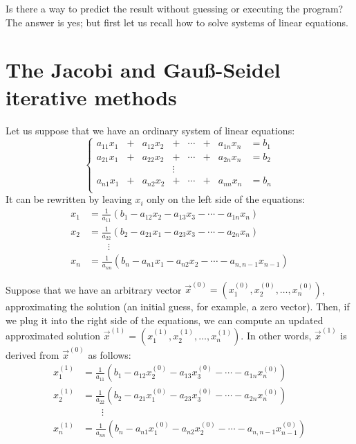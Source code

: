 \documentclass[notitlepage,oneside]{book}
\begin{document}
Is there a way to predict the result without guessing or executing the program? The answer is yes; but first let us recall how to solve systems of linear equations.

\section{The Jacobi and Gauß-Seidel iterative methods}
\label{sec:gauss-seidel}
Let us suppose that we have an ordinary system of linear equations:
$$
\left\{
\begin{array}{cccccccc}
a_{11}x_1 & + &  a_{12}x_2  &+      & \cdots & + & a_{1n}x_n &= b_1\\
a_{21}x_1 & + &  a_{22}x_2  &+      & \cdots & + & a_{2n}x_n &= b_2\\
          &   &             &\vdots &        &   &           &     \\
a_{n1}x_1 & + &  a_{n2}x_2  &+      & \cdots & + & a_{nn}x_n &= b_n\\
\end{array}
\right.
$$
It can be rewritten by leaving  $x_i$ only on the left side of the equations:
\begin{align*}
x_1 &= \frac{1}{a_{11}}(b_1 - a_{12}x_2 - a_{13}x_3 - \cdots - a_{1n}x_n)\\
x_2 &= \frac{1}{a_{22}}(b_2 - a_{21}x_1 - a_{23}x_3 - \cdots - a_{2n}x_n)\\
    & \qquad \vdots \\
x_n &= \frac{1}{a_{nn}}(b_n - a_{n1}x_1 - a_{n2}x_2 - \cdots - a_{n,n-1}x_{n-1})
\end{align*}

Suppose that we have an arbitrary vector $\vec{x}^{(0)}=\left(x_1^{(0)}, x_2^{(0)}, \dots, x_n^{(0)}\right)$, approximating the solution (an initial guess, for example, a zero vector).
Then, if we plug it into the right side of the equations, we can compute an updated approximated solution $\vec{x}^{(1)}=\left(x_1^{(1)}, x_2^{(1)}, \dots, x_n^{(1)}\right)$.
In other words, $\vec{x}^{(1)}$ is derived from $\vec{x}^{(0)}$ as follows:
\begin{align*}
x_1^{(1)} &= \frac{1}{a_{11}}(b_1 - a_{12}x_2^{(0)} - a_{13}x_3^{(0)} - \cdots - a_{1n}x_n^{(0)})\\
x_2^{(1)} &= \frac{1}{a_{22}}(b_2 - a_{21}x_1^{(0)} - a_{23}x_3^{(0)} - \cdots - a_{2n}x_n^{(0)})\\
    & \qquad \vdots \\
x_n^{(1)} &= \frac{1}{a_{nn}}(b_n - a_{n1}x_1^{(0)} - a_{n2}x_2^{(0)} - \cdots - a_{n,n-1}x_{n-1}^{(0)})
\end{align*}
\end{document}
